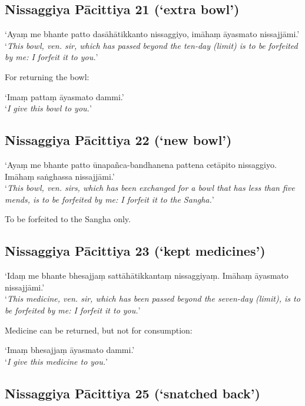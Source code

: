 \subsection{Nissaggiya Pācittiya 21 (‘extra bowl’)}

‘Ayaṃ me bhante patto dasāhātikkanto nissaggiyo, imāhaṃ āyasmato nissajjāmi.’\\
‘\emph{This bowl, ven. sir, which has passed beyond the ten-day (limit) is to be
  forfeited by me: I forfeit it to you.}’


For returning the bowl:

‘Imaṃ pattaṃ āyasmato dammi.’\\
‘\emph{I give this bowl to you.}’ 

\subsection{Nissaggiya Pācittiya 22 (‘new bowl’)}

‘Ayaṃ me bhante patto ūnapañca-bandhanena pattena cetāpito nissaggiyo. Imāhaṃ
saṅghassa nissajjāmi.’\\
‘\emph{This bowl, ven. sirs, which has been exchanged for a bowl that has less
  than five mends, is to be forfeited by me: I forfeit it to the Sangha.}’

To be forfeited to the Sangha only. 

\subsection{Nissaggiya Pācittiya 23 (‘kept medicines’)}

‘Idaṃ me bhante bhesajjaṃ sattāhātikkantaṃ nissaggiyaṃ. Imāhaṃ āyasmato
nissajjāmi.’\\
‘\emph{This medicine, ven. sir, which has been passed beyond the seven-day
  (limit), is to be forfeited by me: I forfeit it to you.}’

Medicine can be returned, but not for consumption:

‘Imaṃ bhesajjaṃ āyasmato dammi.’\\
‘\emph{I give this medicine to you.}’ 

\subsection{Nissaggiya Pācittiya 25 (‘snatched back’)}

